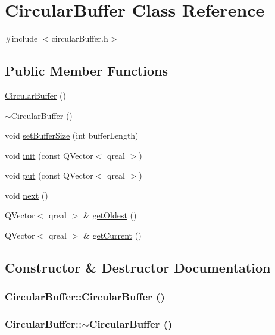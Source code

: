\hypertarget{class_circular_buffer}{
\section{CircularBuffer Class Reference}
\label{class_circular_buffer}
}


{\ttfamily \#include $<$circularBuffer.h$>$}\subsection*{Public Member Functions}
\begin{DoxyCompactItemize}
\item 
\hyperlink{class_circular_buffer_a8c5de0e610bb50bac684f4707e23431c}{CircularBuffer} ()
\item 
\hyperlink{class_circular_buffer_a916f9506cf86010056d189b51fd72c91}{$\sim$CircularBuffer} ()
\item 
void \hyperlink{class_circular_buffer_ae9f2d25b6b0a7f2eda25147a0bfbac93}{setBufferSize} (int bufferLength)
\item 
void \hyperlink{class_circular_buffer_aa79025f00e3b84355eb037a5755b2700}{init} (const QVector$<$ qreal $>$)
\item 
void \hyperlink{class_circular_buffer_a279c6c54d6a7f1f94d3d5311dc8a631f}{put} (const QVector$<$ qreal $>$)
\item 
void \hyperlink{class_circular_buffer_aa90e1d3b23077235958bfc60e7b02805}{next} ()
\item 
QVector$<$ qreal $>$ \& \hyperlink{class_circular_buffer_a9f6b11ef3601e32beac4d5525211ce52}{getOldest} ()
\item 
QVector$<$ qreal $>$ \& \hyperlink{class_circular_buffer_a7c4096d1efc8e1cdc9f5be5be3c349e1}{getCurrent} ()
\end{DoxyCompactItemize}


\subsection{Constructor \& Destructor Documentation}
\hypertarget{class_circular_buffer_a8c5de0e610bb50bac684f4707e23431c}{
\subsubsection[{CircularBuffer}]{\setlength{\rightskip}{0pt plus 5cm}CircularBuffer::CircularBuffer ()}}
\label{class_circular_buffer_a8c5de0e610bb50bac684f4707e23431c}
\hypertarget{class_circular_buffer_a916f9506cf86010056d189b51fd72c91}{
\subsubsection[{$\sim$CircularBuffer}]{\setlength{\rightskip}{0pt plus 5cm}CircularBuffer::$\sim$CircularBuffer ()}}
\label{class_circular_buffer_a916f9506cf86010056d189b51fd72c91}


